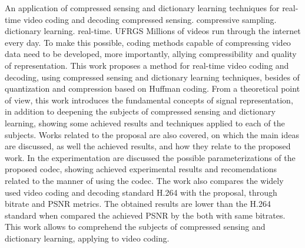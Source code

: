 \documentclass[cic,tc]{iiufrgs}
\begin{document}
\begin{englishabstract}{An application of compressed sensing and dictionary learning techniques for real-time video coding and decoding}
    {compressed sensing. compressive sampling. dictionary learning. real-time. UFRGS}
    Millions of videos run through the internet every day.
    To make this possible, 
    coding methods capable of compressing video data need to be developed,
    more importantly, allying compressibility and quality of representation.
    This work proposes a method for real-time video coding and decoding,
    using compressed sensing and dictionary learning techniques, besides of quantization 
    and compression based on Huffman coding.
    From a theoretical point of view, this work introduces the fundamental concepts of 
    signal representation, in addition to deepening the subjects of compressed sensing 
    and dictionary learning, showing some achieved results and techniques applied to each of the subjects.
    Works related to the proposal are also covered,
    on which the main ideas are discussed, as well the achieved results, 
    and how they relate to the proposed work.
    In the experimentation are discussed the possible parameterizations of 
    the proposed codec, showing achieved experimental results and recomendations 
    related to the manner of using the codec.
    The work also compares the widely used video coding and decoding standard H.264
    with the proposal, through bitrate and PSNR metrics.
    The obtained results are lower than the H.264 standard when compared the achieved PSNR by the both 
    with same bitrates.
    This work allows to comprehend the subjects of compressed sensing and dictionary learning, 
    applying to video coding.
\end{englishabstract}

\listoffigures

\listoftables
\end{document}
